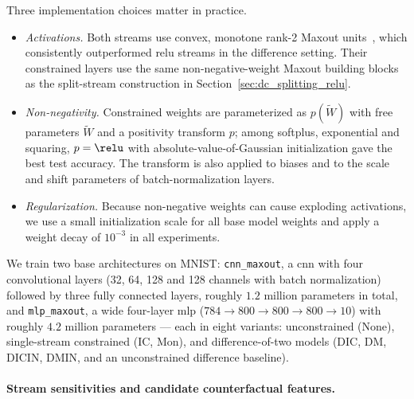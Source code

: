 Three implementation choices matter in practice.
\begin{itemize}
	\item \emph{Activations.} Both streams use convex, monotone rank-2 Maxout units~\parencite{Goodfellow2013Maxout}, which consistently outperformed \ac{relu} streams in the difference setting. Their constrained layers use the same non-negative-weight Maxout building blocks as the split-stream construction in Section~\ref{sec:dc_splitting_relu}.
	\item \emph{Non-negativity.} Constrained weights are parameterized as $p(\tilde{W})$ with free parameters $\tilde{W}$ and a positivity transform $p$; among softplus, exponential and squaring, $p = \relu$ with absolute-value-of-Gaussian initialization gave the best test accuracy. The transform is also applied to biases and to the scale and shift parameters of batch-normalization layers.
	\item \emph{Regularization.} Because non-negative weights can cause exploding activations, we use a small initialization scale for all base model weights and apply a weight decay of $10^{-3}$ in all experiments.
\end{itemize}

We train two base architectures on MNIST: \texttt{cnn\_maxout}, a \ac{cnn} with four convolutional layers (32, 64, 128 and 128 channels with batch normalization) followed by three fully connected layers, roughly $1.2$ million parameters in total, and \texttt{mlp\_maxout}, a wide four-layer \ac{mlp} ($784 \to 800 \to 800 \to 800 \to 10$) with roughly $4.2$ million parameters --- each in eight variants: unconstrained (None), single-stream constrained (IC, Mon), and difference-of-two models (DIC, DM, DICIN, DMIN, and an unconstrained difference baseline).

\paragraph{Stream sensitivities and candidate counterfactual features.}\label{subsec:counterfactual_features}

